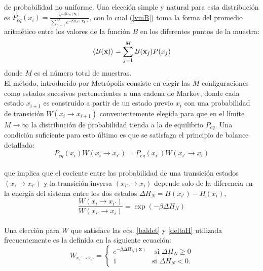  de probabilidad no uniforme. Una elección simple y natural para esta distribución es  $P_{eq}(x_{i})=\frac{e^{-\beta H_N(\mathbf{x}_i)}}{\sum_{n=1}^{M}{e^{-\beta H_N(\mathbf{x_{n}})}}}$,
 con lo cual (\ref{vmB}) toma la forma del promedio aritmético entre los valores de la función $B$ en los diferentes puntos de la muestra:
\\
\begin{equation}
\langle B(\mathbf{x}) \rangle=\displaystyle\sum_{j=1}^{M}{B(\mathbf{x}_j)P(x_{j})}
\label{vmB1}
\end{equation}
 donde $M$ es el número total de muestras.\\
El método, introducido por Metrópolis \cite{metropolis} consiste en elegir las $M$ configuraciones como estados sucesivos pertenecientes a una cadena de Markov, donde cada
 estado ${x_{i+1}}$ es construido a partir de un estado previo ${x_{i}}$ con una probabilidad de transición $W(x_{i} \rightarrow x_{i+1})$ convenientemente elegida
 para que en el límite $M\rightarrow \infty$ la distribución de probabilidad tienda a la de equilibrio $P_{eq}$. Una condición suficiente para esto último es que se satisfaga
 el principio de balance detallado:
 \\
\begin{equation}
P_{eq}(x_{i})W(x_{i} \rightarrow x_{i'})=P_{eq}(x_{i'})W(x_{i'} \rightarrow x_{i})
\label{baldet}
\end{equation}
\\

 que implica que el cociente entre las probabilidad de una transición estados $(x_{i}\rightarrow x_{i'})$ y la transición inversa $(x_{i'}\rightarrow x_{i})$ depende solo
 de la diferencia en la energía del sistema entre los dos estados $\Delta H_{N} = H(x_{i'})-H(x_{i})$,
\\
\begin{equation}
\label{deltaH}
\frac{W(x_{i} \rightarrow x_{i'})}{W(x_{i'} \rightarrow x_{i})}=\exp{(-\beta \Delta H_{N})}
\end{equation}
\\

Una elección para $W$ que satisface las ecs. \ref{baldet} y \ref{deltaH} utilizada frecuentemente es la definida en la siguiente ecuación:
\\
\begin{equation}
W_{x_{i} \rightarrow x_{i'}}= 
\begin{cases}
e^{-\beta \Delta H_N(\mathbf{x})} & \text{ si $\Delta H_N \geq 0$}\\
1 &\text{si $\Delta H_N<0$}.
\label{eq:prob_trans}
\end{cases}
\end{equation}


